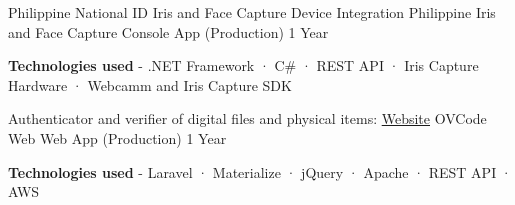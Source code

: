 
\begin{cventries}

  \cventry
    {Philippine National ID Iris and Face Capture Device Integration} %
    {Philippine Iris and Face Capture } %
    {Console App (Production)} %
    {1 Year} %
    {
      \begin{cvitems} %
        \item {\textbf{Technologies used} \hspace{0.03cm} - \hspace{0.03cm} .NET Framework \hspace{0.03cm} · \hspace{0.03cm} C\# \hspace{0.03cm} · \hspace{0.03cm} REST API \hspace{0.03cm} · \hspace{0.03cm} Iris Capture Hardware \hspace{0.03cm} · \hspace{0.03cm} Webcamm and Iris Capture SDK \\}
      \end{cvitems}
    }
  \cventry
    {Authenticator and verifier of digital files and physical items: \href{https://ovcode.com/}{Website} } %
    {OVCode Web} %
    {Web App (Production)} %
    {1 Year} %
    {
      \begin{cvitems} %
        \item {\textbf{Technologies used} \hspace{0.03cm} - \hspace{0.03cm} Laravel \hspace{0.03cm} · \hspace{0.03cm} Materialize \hspace{0.03cm} · \hspace{0.03cm} jQuery \hspace{0.03cm} · \hspace{0.03cm} Apache \hspace{0.03cm} · \hspace{0.03cm} REST API \hspace{0.03cm} · \hspace{0.03cm} AWS \\}

\end{cvitems}}
\end{cventries}
